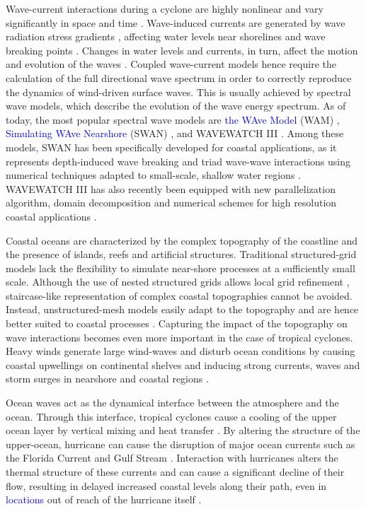 \documentclass[preprint,12pt,authoryear]{elsarticle}
\newcommand{\modif}[1]{\textcolor{blue}{#1}}
\begin{document}
Wave-current interactions during a cyclone are highly nonlinear and vary significantly in space and time \citep{wu2011fvcom}. Wave-induced currents are generated by wave radiation stress gradients \citep{longuet1970longshore}, affecting water levels near shorelines and wave breaking points \citep{longuet1964radiation}. Changes in water levels and currents, in turn, affect the motion and evolution of the waves \citep{sikiric2013coupling}. Coupled wave-current models hence require the calculation of the full directional wave spectrum in order to correctly reproduce the dynamics of wind-driven surface waves. This is usually achieved by spectral wave models, which describe the evolution of the wave energy spectrum. As of today, the most popular spectral wave models are \modif{the WAve Model} (WAM) \citep{group1988wam}, %
\modif{Simulating WAve Nearshore} (SWAN) \citep{booij1999third}, and WAVEWATCH III \citep{tolman2009user}. Among these models, SWAN has been specifically developed for coastal applications, as it represents depth-induced wave breaking and triad wave-wave interactions using numerical techniques adapted to small-scale, shallow water regions \citep{booij1999third}. WAVEWATCH III has also recently been equipped with new parallelization algorithm, domain decomposition and numerical schemes for high resolution coastal applications \citep{ww3dg,abdolali2020large}.

Coastal oceans are characterized by the complex topography of the coastline and the presence of islands, reefs and artificial structures. Traditional structured-grid models lack the flexibility to simulate near-shore processes at a sufficiently small scale. Although the use of nested structured grids allows local grid refinement \citep{warner2010development}, staircase-like representation of complex coastal topographies cannot be avoided. Instead, unstructured-mesh models easily adapt to the topography and are hence better suited to coastal processes \citep{fringer2019future}. Capturing the impact of the topography on wave interactions becomes even more important in the case of tropical cyclones. Heavy winds generate large wind-waves and disturb ocean conditions \citep{liu2020impacts} by causing coastal upwellings on continental shelves \citep{smith1982response} and inducing strong currents, waves and storm surges in nearshore and coastal regions \citep{dietrich2010high, weisberg2006hurricane}. 

Ocean waves act as the dynamical interface between the atmosphere and the ocean. Through this interface, tropical cyclones cause a cooling of the upper ocean layer by vertical mixing and heat transfer \citep{aijaz2017nonbreaking,varlas2020investigating}. By altering the structure of the upper-ocean, hurricane can cause the disruption of major ocean currents such as the Florida Current and Gulf Stream \citep{oey2007hurricane}. Interaction with hurricanes alters the thermal structure of these currents and can cause a significant decline of their flow, resulting in delayed increased coastal levels along their path, even in \modif{locations} out of reach of the hurricane itself \citep{ezer2017observations, ezer2018interaction,ezer2020long}.
\end{document}
